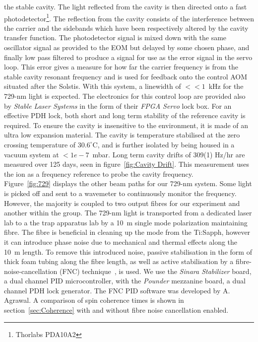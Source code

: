     the stable cavity. The light reflected from the cavity is then directed onto
    a fast photodetector\footnote{Thorlabs PDA10A2}. The reflection from the
    cavity consists of the interference between the carrier and the sidebands
    which have been respectively altered by the cavity transfer function. The
    photodetector signal is mixed down with the same oscillator signal as
    provided to the EOM but delayed by some chosen phase, and finally low pass
    filtered to produce a signal for use as the error signal in the servo loop.
    This error gives a measure for how far the carrier frequency is from the
    stable cavity resonant frequency and is used for feedback onto the control
    AOM situated after the Solstis.
    With this system, a linewidth of $<<1$~kHz for the 729-nm light is expected. 
    The electronics for this control loop are
    provided also by \emph{Stable Laser Systems} in the form of their \emph{FPGA Servo}
    lock box. For an effective PDH lock, both short and long term
    stability of the reference cavity is required. To ensure the cavity is insensitive to
    the environment, it is made of an ultra low expansion material. 
    The cavity is temperature stabilised at the zero crossing temperature of
    $30.6^\circ$C, and is further isolated by being housed in a vacuum system
    at $<1e-7$~mbar. Long term cavity drifts of 309(1) Hz/hr are measured over
    125 days, seen in figure~\ref{fig:Cavity Drift}. This measurement uses the ion as a
    frequency reference to probe the cavity frequency.\\
    Figure~\ref{fig:729} displays the other beam paths for our 729-nm system.
    Some light is picked off and sent to a wavemeter to continuously monitor the
    frequency. However, the majority is coupled to two output fibres for our
    experiment and another within the group. The 729-nm light is transported from
    a dedicated laser lab to a the trap apparatus lab by a 10~m
    single mode polarization maintaining fibre.  The fibre is
    beneficial in cleaning up the mode from the Ti:Sapph, however it can
    introduce phase noise due to mechanical and thermal effects along the 10~m
    length. To remove this introduced noise, passive stabilisation in
    the form of thick foam tubing along the fibre length, as well as active
    stabilisation by a fibre-noise-cancellation (FNC) technique~\cite{ma1994delivering}, is used. We use the \emph{Sinara Stabilizer} board, a
    dual channel PID microcontroller, with the \emph{Pounder}
    mezzanine board, a dual channel PDH lock generator. The FNC PID software was
    developed by A. Agrawal. A comparison of spin coherence times
    is shown in section~\ref{sec:Coherence} with and without fibre noise
    cancellation enabled. \\


